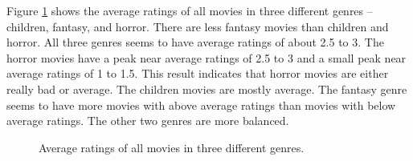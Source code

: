 Figure \ref{fig:average-3-genres} shows the average ratings of all movies in three different genres -- children, fantasy, and horror. There are less fantasy movies than children and horror. All three genres seems to have average ratings of about 2.5 to 3. The horror movies have a peak near average ratings of 2.5 to 3 and a small peak near average ratings of 1 to 1.5. This result indicates that horror movies are either really bad or average. The children movies are mostly average. The fantasy genre seems to have more movies with above average ratings than movies with below average ratings. The other two genres are more balanced.


\begin{figure}[H]
	\centering
	\caption{Average ratings of all movies in three different genres.} \label{fig:average-3-genres}
\end{figure}
